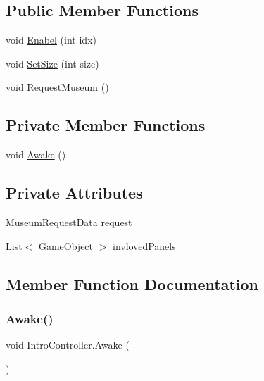 \subsection*{Public Member Functions}
\begin{DoxyCompactItemize}
\item 
void \mbox{\hyperlink{class_intro_controller_af189f110e2a1fc56f21c2e5d91af849f}{Enabel}} (int idx)
\item 
void \mbox{\hyperlink{class_intro_controller_a87be0da70dd6d5aee2808072978c2ff6}{Set\+Size}} (int size)
\item 
void \mbox{\hyperlink{class_intro_controller_afdc3da184119a836c16a44e5615bc2f9}{Request\+Museum}} ()
\end{DoxyCompactItemize}
\subsection*{Private Member Functions}
\begin{DoxyCompactItemize}
\item 
void \mbox{\hyperlink{class_intro_controller_a2e454b9889a5f12aae6f0b9ada1534e8}{Awake}} ()
\end{DoxyCompactItemize}
\subsection*{Private Attributes}
\begin{DoxyCompactItemize}
\item 
\mbox{\hyperlink{class_museum_request_data}{Museum\+Request\+Data}} \mbox{\hyperlink{class_intro_controller_a06727e6268f720c81ec061f6ff1faa88}{request}}
\item 
List$<$ Game\+Object $>$ \mbox{\hyperlink{class_intro_controller_aa4a4ba4580a40af426f5b210a0c13617}{invloved\+Panels}}
\end{DoxyCompactItemize}


\subsection{Member Function Documentation}
\mbox{\label{class_intro_controller_a2e454b9889a5f12aae6f0b9ada1534e8}} 
\subsubsection{\texorpdfstring{Awake()}{Awake()}}
{\footnotesize\ttfamily void Intro\+Controller.\+Awake (\begin{DoxyParamCaption}{ }\end{DoxyParamCaption})\hspace{0.3cm}{\ttfamily [private]}}

